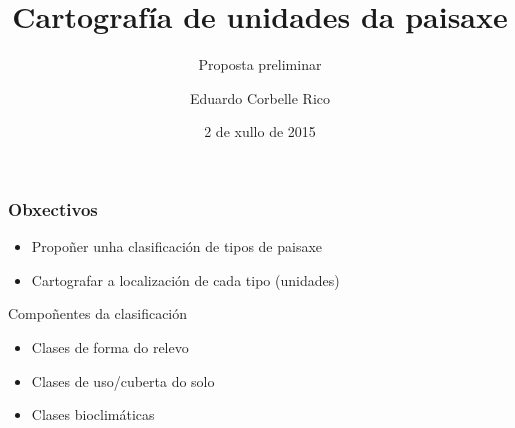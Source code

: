 \usepackage[english,spanish,galician]{babel}
\usepackage[T1]{fontenc}
\usepackage[utf8x]{inputenc}
\usepackage{default}
\usepackage{array}
\usepackage{chngpage}
\usepackage{url}
\usepackage{booktabs}
\usepackage{animate}


\title{Cartografía de unidades da paisaxe}
\subtitle{Proposta preliminar}
\author{Eduardo Corbelle Rico} 
\date{2 de xullo de 2015}





\graphicspath{{"/home/edujose/Traballo/Proxectos/2015_04_CatalogoPaisaxe/Reports/Report1/Figures/"}}


\setcounter{tocdepth}{1}




\begin{frame}[plain]
 \vspace{2cm}
 \titlepage
\end{frame}

%



\begin{frame}
\frametitle{Obxectivos}
 \begin{itemize}
  \item Propoñer unha clasificación de \alert{tipos de paisaxe}
  \item Cartografar a localización de cada tipo (\alert{unidades})
 \end{itemize}
 
\pause
 \begin{block}{Compoñentes da clasificación}
  \begin{itemize}
   \item Clases de forma do relevo
   \item Clases de uso/cuberta do solo
   \item Clases bioclimáticas
  \end{itemize}
 \end{block} 
\end{frame}


